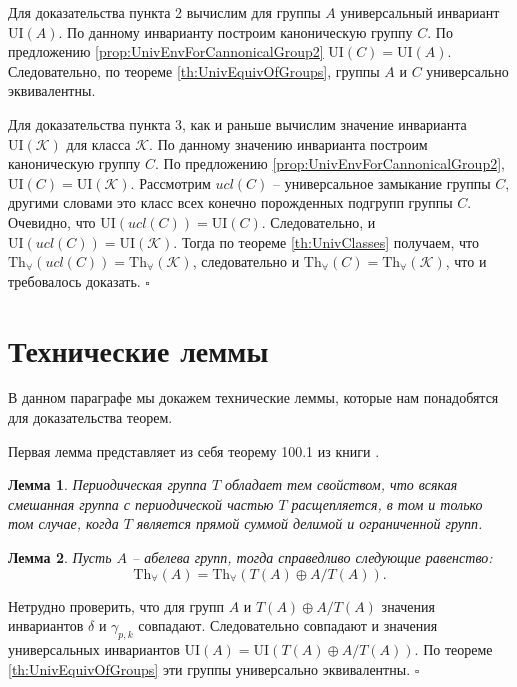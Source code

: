 \documentclass[a4paper,11pt,twoside]{article}
\newtheorem{lemma}{Лемма}[section]
\def\proof{{\noindent{\bf Доказательство.}} }
\def\K{{\mathcal{K}}}
\def\Tha{{\mathrm{Th}_\forall}}
\def\ui{{\mathrm{UI}}}
\begin{document}
Для доказательства пункта 2 вычислим для группы $A$ универсальный инвариант $\ui(A)$. По данному инварианту построим каноническую группу $C$. По предложению \ref{prop:UnivEnvForCannonicalGroup2} $\ui(C) = \ui(A)$. Следовательно, по теореме \ref{th:UnivEquivOfGroups}, группы $A$ и $C$ универсально эквивалентны.

Для доказательства пункта 3, как и раньше вычислим значение инварианта $\ui(\K)$ для класса $\K$. По данному значению инварианта построим каноническую группу $C$. По предложению \ref{prop:UnivEnvForCannonicalGroup2}, $\ui(C) = \ui(\K).$ Рассмотрим $ucl(C)$ -- универсальное замыкание группы $C$, другими словами это класс всех конечно порожденных подгрупп группы $C$. Очевидно, что $\ui(ucl(C)) = \ui(C)$. Следовательно, и $\ui(ucl(C)) = \ui(\K)$. Тогда по теореме \ref{th:UnivClasses} получаем, что $\Tha(ucl(C)) = \Tha(\K)$, следовательно и $\Tha(C) = \Tha(\K)$, что и требовалось доказать. $\square$






\section{Технические леммы}\label{sec:lemmas}

В данном параграфе мы докажем технические леммы, которые нам понадобятся для доказательства теорем. 

Первая лемма представляет из себя теорему 100.1 из книги \cite{Fuchs2}.

\begin{lemma}\label{lemma:Fuchs}
Периодическая группа $T$ обладает тем свойством, что всякая смешанная группа с периодической частью $T$ расщепляется, в том и только том случае, когда $T$ является прямой суммой делимой и ограниченной групп.
\end{lemma}

\begin{lemma}\label{lemma:UnivEquivATA}
Пусть $A$ -- абелева групп, тогда справедливо следующие равенство:
$$\Tha(A) = \Tha(T(A) \oplus A \big/ T(A)).$$
\end{lemma}

\proof Нетрудно проверить, что для групп $A$ и $T(A) \oplus A \big/ T(A)$ значения инвариантов $\delta$ и $\gamma_{p,k}$ совпадают. Следовательно совпадают и значения универсальных инвариантов $\ui(A) = \ui(T(A) \oplus A \big/ T(A))$. По теореме \ref{th:UnivEquivOfGroups} эти группы универсально эквивалентны. $\square$
\end{document}
